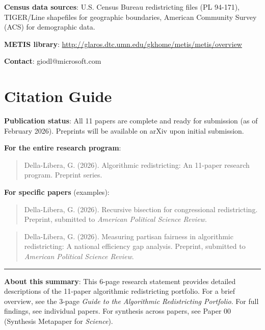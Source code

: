 \documentclass[11pt]{article}
\begin{document}
\textbf{Census data sources}: U.S. Census Bureau redistricting files (PL 94-171), TIGER/Line shapefiles for geographic boundaries, American Community Survey (ACS) for demographic data.

\textbf{METIS library}: \url{http://glaros.dtc.umn.edu/gkhome/metis/metis/overview}

\textbf{Contact}: giodl@microsoft.com

\section*{Citation Guide}

\textbf{Publication status}: All 11 papers are complete and ready for submission (as of February 2026). Preprints will be available on arXiv upon initial submission.

\textbf{For the entire research program}:

\begin{quote}
Della-Libera, G. (2026). Algorithmic redistricting: An 11-paper research program. Preprint series.
\end{quote}

\textbf{For specific papers} (examples):

\begin{quote}
Della-Libera, G. (2026). Recursive bisection for congressional redistricting. Preprint, submitted to \emph{American Political Science Review}.
\end{quote}

\begin{quote}
Della-Libera, G. (2026). Measuring partisan fairness in algorithmic redistricting: A national efficiency gap analysis. Preprint, submitted to \emph{American Political Science Review}.
\end{quote}

\vspace{12pt}

\noindent\rule{\textwidth}{0.4pt}

\vspace{6pt}

\noindent\textbf{About this summary}: This 6-page research statement provides detailed descriptions of the 11-paper algorithmic redistricting portfolio. For a brief overview, see the 3-page \emph{Guide to the Algorithmic Redistricting Portfolio}. For full findings, see individual papers. For synthesis across papers, see Paper 00 (Synthesis Metapaper for \emph{Science}).
\end{document}
